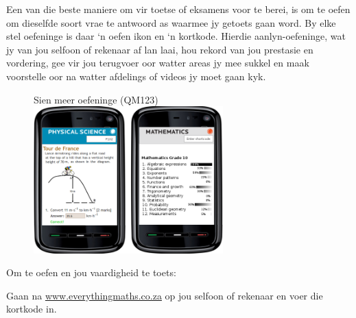 Een van die beste maniere om vir toetse of eksamens voor te berei, is om te oefen om dieselfde soort vrae te antwoord as waarmee jy getoets gaan word. By elke stel oefeninge is daar ‘n oefen ikon en ‘n kortkode. Hierdie aanlyn-oefeninge, wat jy van jou selfoon of rekenaar af lan laai, hou rekord van jou prestasie en vordering, gee vir jou terugvoer oor watter areas jy mee sukkel en maak voorstelle oor na watter afdelings of videos jy moet gaan kyk.


\begin{figure}[h]
\begin{center}
Sien meer oefeninge   (QM123)\vspace{0.4cm}\\ 
\includegraphics[width=0.65\textwidth]{title_images/practicephones.png}
\end{center}
\end{figure}
\par


Om te oefen en jou vaardigheid te toets:\par

Gaan na \underline{www.everythingmaths.co.za} op jou selfoon of rekenaar en voer die kortkode in.\partykeer
\vspace*{1cm}

%
%


